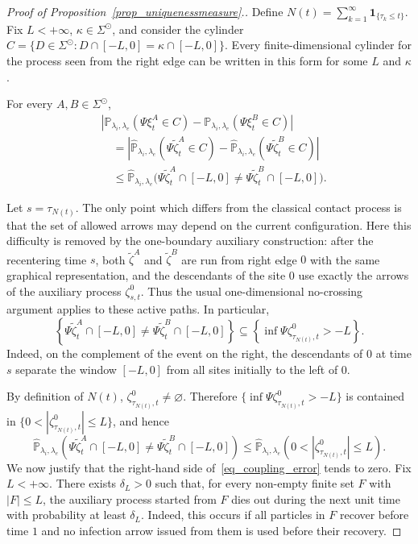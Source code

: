 \documentclass[11pt,a4paper]{article}
\theoremstyle{plain}
\theoremstyle{definition}
\theoremstyle{remark}
\numberwithin{equation}{section}
\begin{document}
\begin{proof}[{Proof of Proposition~\ref{prop_uniquenessmeasure}.}]
	Define $N(t)=\sum_{k=1}^{\infty}\mathbf{1}_{\{\tau_k\le t\}}$. Fix $L<+\infty$, $\kappa\in\Sigma^{\odot}$, and consider the cylinder $C=\{D\in\Sigma^{\odot}:D\cap[-L,0]=\kappa\cap[-L,0]\}$. Every finite-dimensional cylinder for the process seen from the right edge can be written in this form for some $L$ and $\kappa$.
	
	For every $A,B\in\Sigma^{\odot}$,
	\begin{equation} \label{eq_difference_cylinder_bound}
		\begin{aligned}
			&|\mathbb{P}_{\lambda_i,\lambda_e}(\Psi\xi_t^A\in C)
			-\mathbb{P}_{\lambda_i,\lambda_e}(\Psi\xi_t^B\in C)|\\
			&\quad=
			|\widehat{\mathbb{P}}_{\lambda_i,\lambda_e}(\Psi\tilde{\zeta}_t^A\in C)
			-\widehat{\mathbb{P}}_{\lambda_i,\lambda_e}(\Psi\tilde{\zeta}_t^B\in C)|\\
			&\quad\leq
			\widehat{\mathbb{P}}_{\lambda_i,\lambda_e}
			\big(\Psi\tilde{\zeta}_t^A\cap[-L,0]
			\neq
			\Psi\tilde{\zeta}_t^B\cap[-L,0]\big).
		\end{aligned}
	\end{equation}
	
	Let $s=\tau_{N(t)}$.  The only point which differs from the classical
	contact process is that the set of allowed arrows may depend on the
	current configuration.  Here this difficulty is removed by the
	one-boundary auxiliary construction: after the recentering time $s$,
	both $\widetilde\zeta^A$ and $\widetilde\zeta^B$ are run from right edge
	$0$ with the same graphical representation, and the descendants of the
	site $0$ use exactly the arrows of the auxiliary process
	$\zeta^0_{s,t}$.  Thus the usual one-dimensional no-crossing argument
	applies to these active paths.  In particular,
	\[
	\left\{
	\Psi\widetilde\zeta^A_t\cap[-L,0]
	\neq
	\Psi\widetilde\zeta^B_t\cap[-L,0]
	\right\}
	\subseteq
	\left\{
	\inf\Psi\zeta^0_{\tau_{N(t)},t}>-L
	\right\}.
	\]
	Indeed, on the complement of the event on the right, the descendants of
	$0$ at time $s$ separate the window $[-L,0]$ from all sites initially to
	the left of $0$.
	
	By definition of $N(t)$, $\zeta^0_{\tau_{N(t)},t}\neq\varnothing$.
	Therefore $\{\inf\Psi\zeta^0_{\tau_{N(t)},t}>-L\}$ is contained in
	$\{0<|\zeta^0_{\tau_{N(t)},t}|\le L\}$, and hence
	\begin{equation}
		\widehat{\mathbb P}_{\lambda_i,\lambda_e}
		\left(
		\Psi\widetilde\zeta^A_t\cap[-L,0]
		\neq
		\Psi\widetilde\zeta^B_t\cap[-L,0]
		\right)
		\le
		\widehat{\mathbb P}_{\lambda_i,\lambda_e}
		\left(
		0<|\zeta^0_{\tau_{N(t)},t}|\le L
		\right).
		\tag{3.2}
		\label{eq_coupling_error}
	\end{equation}
	We now justify that the right-hand side of~\eqref{eq_coupling_error} tends to zero. Fix $L<+\infty$. There exists $\delta_L>0$ such that, for every non-empty finite set $F$ with $|F|\leq L$, the auxiliary process started from $F$ dies out during the next unit time with probability at least $\delta_L$. Indeed, this occurs if all particles in $F$ recover before time $1$ and no infection arrow issued from them is used before their recovery.
	

\end{proof}
\end{document}
